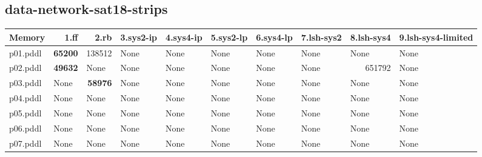 \documentclass{article}
\begin{document}
\hypertarget{memory-data-network-sat18-strips}{}
\subsection*{data-network-sat18-strips}

\begin{tabular}{@{}lrrrrrrrrr@{}}
Memory & 1.ff & 2.rb & 3.sys2-ip & 4.sys4-ip & 5.sys2-lp & 6.sys4-lp & 7.lsh-sys2 & 8.lsh-sys4 & 9.lsh-sys4-limited \\
\midrule
p01.pddl & \textbf{65200} & 138512 & \multicolumn{1}{|l|}{None} & \multicolumn{1}{|l|}{None} & \multicolumn{1}{|l|}{None} & \multicolumn{1}{|l|}{None} & \multicolumn{1}{|l|}{None} & \multicolumn{1}{|l|}{None} & \multicolumn{1}{|l|}{None} \\
p02.pddl & \textbf{49632} & \multicolumn{1}{|l|}{None} & \multicolumn{1}{|l|}{None} & \multicolumn{1}{|l|}{None} & \multicolumn{1}{|l|}{None} & \multicolumn{1}{|l|}{None} & \multicolumn{1}{|l|}{None} & 651792 & \multicolumn{1}{|l|}{None} \\
p03.pddl & \multicolumn{1}{|l|}{None} & \textbf{58976} & \multicolumn{1}{|l|}{None} & \multicolumn{1}{|l|}{None} & \multicolumn{1}{|l|}{None} & \multicolumn{1}{|l|}{None} & \multicolumn{1}{|l|}{None} & \multicolumn{1}{|l|}{None} & \multicolumn{1}{|l|}{None} \\
p04.pddl & \multicolumn{1}{|l|}{None} & \multicolumn{1}{|l|}{None} & \multicolumn{1}{|l|}{None} & \multicolumn{1}{|l|}{None} & \multicolumn{1}{|l|}{None} & \multicolumn{1}{|l|}{None} & \multicolumn{1}{|l|}{None} & \multicolumn{1}{|l|}{None} & \multicolumn{1}{|l|}{None} \\
p05.pddl & \multicolumn{1}{|l|}{None} & \multicolumn{1}{|l|}{None} & \multicolumn{1}{|l|}{None} & \multicolumn{1}{|l|}{None} & \multicolumn{1}{|l|}{None} & \multicolumn{1}{|l|}{None} & \multicolumn{1}{|l|}{None} & \multicolumn{1}{|l|}{None} & \multicolumn{1}{|l|}{None} \\
p06.pddl & \multicolumn{1}{|l|}{None} & \multicolumn{1}{|l|}{None} & \multicolumn{1}{|l|}{None} & \multicolumn{1}{|l|}{None} & \multicolumn{1}{|l|}{None} & \multicolumn{1}{|l|}{None} & \multicolumn{1}{|l|}{None} & \multicolumn{1}{|l|}{None} & \multicolumn{1}{|l|}{None} \\
p07.pddl & \multicolumn{1}{|l|}{None} & \multicolumn{1}{|l|}{None} & \multicolumn{1}{|l|}{None} & \multicolumn{1}{|l|}{None} & \multicolumn{1}{|l|}{None} & \multicolumn{1}{|l|}{None} & \multicolumn{1}{|l|}{None} & \multicolumn{1}{|l|}{None} & \multicolumn{1}{|l|}{None} \\

\end{tabular}
\end{document}
